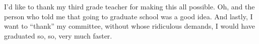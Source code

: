 I'd like to thank my third grade teacher for making this all possible.
Oh, and the person who told me that going to graduate school was a
good idea.  And lastly, I want to ``thank'' my committee, without
whose ridiculous demands, I would have graduated so, so, very much
faster.

